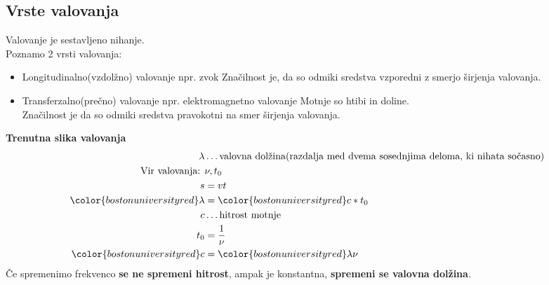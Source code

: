 {\color{indiagreen}\subsection{Vrste valovanja}}
Valovanje je sestavljeno nihanje.\\
Poznamo 2 vrsti valovanja:
\begin{itemize}
	\item Longitudinalno(vzdolžno) valovanje npr. zvok
	Značilnost je, da so odmiki sredstva vzporedni z smerjo širjenja valovanja.
	\item Transferzalno(prečno) valovanje npr. elektromagnetno valovanje
	Motnje so htibi in doline.\\
	Značilnost je da so odmiki sredstva pravokotni na smer širjenja valovanja.
\end{itemize}

\textbf{Trenutna slika valovanja}
\begin{align*}
	\lambda &\dots \text{valovna dolžina(razdalja med dvema sosednjima deloma, ki nihata sočasno)}\\
	\text{Vir valovanja: } & \nu, t_0\\
	s &= vt\\
	{\color{bostonuniversityred}\lambda} &= {\color{bostonuniversityred}c * t_0}\\
	c &\dots \text{hitrost motnje}\\
	t_0 &= \frac{1}{\nu}\\
	{\color{bostonuniversityred}c} &= {\color{bostonuniversityred}\lambda \nu}\\
\end{align*}
Če spremenimo frekvenco \textbf{se ne spremeni hitrost}, ampak je konstantna, \textbf{spremeni se valovna dolžina}.
